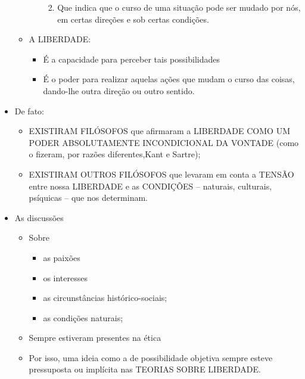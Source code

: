 \documentclass[
]{book}
\providecommand{\tightlist}{%
  \setlength{\itemsep}{0pt}\setlength{\parskip}{0pt}}
\begin{document}
\begin{itemize}
\begin{itemize}
\begin{itemize}
      \begin{enumerate}
      \def\labelenumi{\alph{enumi}.}
      \tightlist
      \item
        Que indica que o curso de uma situação pode ser mudado por nós, em certas direções e sob certas condições.
      \end{enumerate}
    \end{itemize}
  \item
    A LIBERDADE:

    \begin{itemize}
    \tightlist
    \item
      É a capacidade para perceber tais possibilidades
    \item
      É o poder para realizar aquelas ações que mudam o curso das coisas, dando-lhe outra direção ou outro sentido.
    \end{itemize}
  \end{itemize}
\item
  De fato:

  \begin{itemize}
  \tightlist
  \item
    EXISTIRAM FILÓSOFOS que afirmaram a LIBERDADE COMO UM PODER ABSOLUTAMENTE INCONDICIONAL DA VONTADE (como o fizeram, por razões diferentes,Kant e Sartre);
  \item
    EXISTIRAM OUTROS FILÓSOFOS que levaram em conta a TENSÃO entre nossa LIBERDADE e as CONDIÇÕES -- naturais, culturais, psíquicas -- que nos determinam.
  \end{itemize}
\item
  As discussões

  \begin{itemize}
  \tightlist
  \item
    Sobre

    \begin{itemize}
    \tightlist
    \item
      as paixões
    \item
      os interesses
    \item
      as circunstâncias histórico-sociais;
    \item
      as condições naturais;
    \end{itemize}
  \item
    Sempre estiveram presentes na ética
  \item
    Por isso, uma ideia como a de possibilidade objetiva sempre esteve pressuposta ou implícita nas TEORIAS SOBRE LIBERDADE.
  \end{itemize}
\end{itemize}
\end{document}
